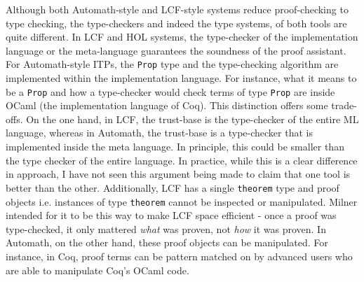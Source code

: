 \documentclass{article}
\begin{document}
  	Although both Automath-style and 
  	LCF-style systems reduce proof-checking
  	to type checking, the type-checkers 
  	and indeed the type systems, 
  	of both tools are quite different.
  	In LCF and HOL systems, the 
  	type-checker of the implementation 
  	language or the meta-language 
  	guarantees the soundness of the
  	proof assistant. For Automath-style
  	ITPs, the \texttt{Prop} type and the 
  	type-checking algorithm are 
  	implemented within the 
  	implementation language. For 
  	instance, what it means to be a 
  	\texttt{Prop} and how a 
  	type-checker would check 
  	terms of type \texttt{Prop} are 
  	inside OCaml (the 
  	implementation language of Coq). 
  	This distinction
  	offers some trade-offs. On the one 
  	hand, in LCF, the trust-base is 
  	the type-checker of the entire
  	ML language, whereas in Automath, 
  	the trust-base is a type-checker
  	that is implemented inside the 
  	meta language. In principle, this 
  	could be smaller than the type
  	checker of the entire language.
  	In practice, while this is a 
  	clear difference in approach,
  	I have not seen this argument 
  	being made to claim that one tool 
  	is better than the other. 
  	Additionally, LCF has a single 
  	\texttt{theorem} type and proof
  	objects i.e. instances of type
  	\texttt{theorem} cannot be 
  	inspected or manipulated. Milner
  	intended for it to be this way
  	to make LCF space efficient - 
  	once a proof was type-checked, 
  	it only mattered \textit{what}
  	was proven, not \textit{how} it 
  	was proven. In Automath, on the 
  	other hand, these proof objects 
  	can be manipulated.
  	For instance, in Coq, proof terms 
  	can be pattern matched on by 
  	advanced users who are able to 
  	manipulate Coq's OCaml code.
  	
\end{document}
